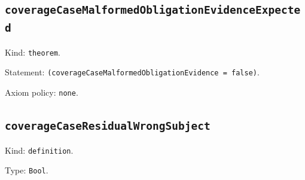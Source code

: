 \documentclass[11pt]{article}
\begin{document}
\subsection*{\texttt{coverageCaseMalformedObligationEvidenceExpected}}
\noindent Kind: \texttt{theorem}.\par
\noindent Statement: \texttt{(coverageCaseMalformedObligationEvidence = false)}.\par
\noindent Axiom policy: \texttt{none}.\par
\subsection*{\texttt{coverageCaseResidualWrongSubject}}
\noindent Kind: \texttt{definition}.\par
\noindent Type: \texttt{Bool}.\par
\end{document}
